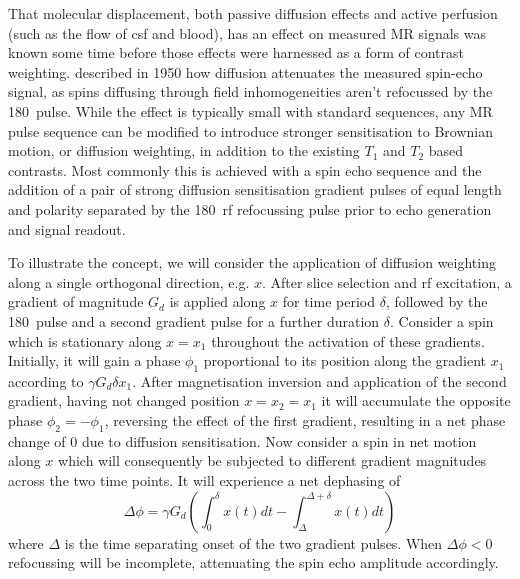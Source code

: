 That molecular displacement, both passive diffusion effects and active perfusion (such as the flow of \gls{csf} and blood\autocite{LeBihan1988}), has an effect on measured MR signals was known some time before those effects were harnessed as a form of contrast weighting.
\textcite{Hahn1950} described in 1950 how diffusion attenuates the measured spin-echo signal, as spins diffusing through field inhomogeneities aren't refocussed by the 180\textdegree\ pulse.
While the effect is typically small with standard sequences, any MR pulse sequence can be modified to introduce stronger sensitisation to Brownian motion, or diffusion weighting, in addition to the existing $T_1$ and $T_2$ based contrasts.
Most commonly this is achieved with a spin echo sequence and the addition of a pair of strong diffusion sensitisation gradient pulses of equal length and polarity separated by the 180\textdegree\ \gls{rf} refocussing pulse prior to echo generation and signal readout.

To illustrate the concept, we will consider the application of diffusion weighting along a single orthogonal direction, e.g. $x$.
After slice selection and \gls{rf} excitation, a gradient of magnitude $G_d$ is applied along $x$ for time period $\delta$, followed by the 180\textdegree\ pulse and a second gradient pulse for a further duration $\delta$.
Consider a spin which is stationary along $x=x_1$ throughout the activation of these gradients.
Initially, it will gain a phase $\phi_1$ proportional to its position along the gradient $x_1$ according to $\gamma G_d \delta x_1$.
After magnetisation inversion and application of the second gradient, having not changed position $x=x_2=x_1$ it will accumulate the opposite phase $\phi_2 = -\phi_1$, reversing the effect of the first gradient, resulting in a net phase change of $0$ due to diffusion sensitisation.
Now consider a spin in net motion along $x$ which will consequently be subjected to different gradient magnitudes across the two time points.
It will experience a net dephasing of
\begin{equation}
  \Delta\phi = \gamma G_d (\int_0^{\delta} x(t) dt - \int_{\Delta}^{\Delta+\delta} x(t) dt)
\end{equation}
where $\Delta$ is the time separating onset of the two gradient pulses.
When $\Delta\phi < 0$ refocussing will be incomplete, attenuating the spin echo amplitude accordingly.

